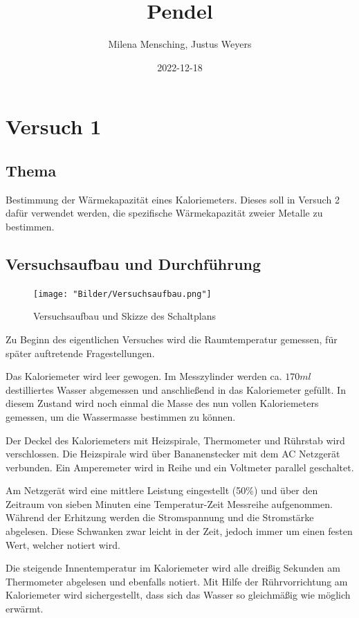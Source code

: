 \documentclass[class=article, crop=false]{standalone}
\title{Pendel}
\author{Milena Mensching, Justus Weyers}
\date{2022-12-18}
\begin{document}
\hypertarget{versuch-1}{%
\section{Versuch 1}\label{versuch-1}}

\hypertarget{thema}{%
\subsection{Thema}\label{thema}}

Bestimmung der Wärmekapazität eines Kaloriemeters. Dieses soll in
Versuch 2 dafür verwendet werden, die spezifische Wärmekapazität zweier
Metalle zu bestimmen.

\hypertarget{versuchsaufbau-und-durchfuxfchrung}{%
\subsection{Versuchsaufbau und
Durchführung}\label{versuchsaufbau-und-durchfuxfchrung}}

\begin{figure}
\centering
\texttt{[image: "Bilder/Versuchsaufbau.png"]}
\caption{Versuchsaufbau und Skizze des Schaltplans}
\end{figure}

Zu Beginn des eigentlichen Versuches wird die Raumtemperatur gemessen,
für später auftretende Fragestellungen.

Das Kaloriemeter wird leer gewogen. Im Messzylinder werden ca. \(170ml\)
destilliertes Wasser abgemessen und anschließend in das Kaloriemeter
gefüllt. In diesem Zustand wird noch einmal die Masse des nun vollen
Kaloriemeters gemessen, um die Wassermasse bestimmen zu können.

Der Deckel des Kaloriemeters mit Heizspirale, Thermometer und Rührstab
wird verschlossen. Die Heizspirale wird über Bananenstecker mit dem AC
Netzgerät verbunden. Ein Amperemeter wird in Reihe und ein Voltmeter
parallel geschaltet.

Am Netzgerät wird eine mittlere Leistung eingestellt (50\%) und über den
Zeitraum von sieben Minuten eine Temperatur-Zeit Messreihe aufgenommen.
Während der Erhitzung werden die Stromspannung und die Stromstärke
abgelesen. Diese Schwanken zwar leicht in der Zeit, jedoch immer um
einen festen Wert, welcher notiert wird.

Die steigende Innentemperatur im Kaloriemeter wird alle dreißig Sekunden
am Thermometer abgelesen und ebenfalls notiert. Mit Hilfe der
Rührvorrichtung am Kaloriemeter wird sichergestellt, dass sich das
Wasser so gleichmäßig wie möglich erwärmt.
\end{document}
